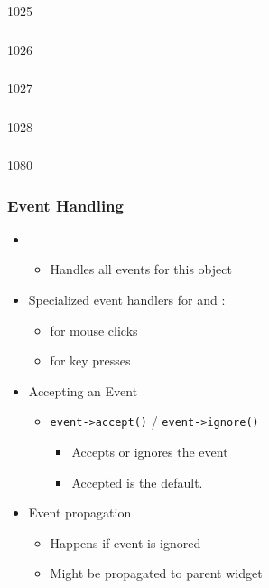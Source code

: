 \begin{slide}{1025}\frametitle{}
\end{slide}

\begin{slide}{1026}\frametitle{}
\end{slide}

\begin{slide}{1027}\frametitle{}
\end{slide}

\begin{slide}{1028}\frametitle{}

\end{slide}

\begin{slide}{1080}
\frametitle{Event Handling}

\begin{itemize}
\item {}
  \begin{itemize}
  \item Handles all events for this object
 \end{itemize}
\item Specialized event handlers for  and :
  \begin{itemize}
  \item {} for mouse clicks
  \item {} for key presses
 \end{itemize}\bigskip
\item Accepting an Event
  \begin{itemize}
  \item \lstinline{event->accept()} / \lstinline{event->ignore()}
    \begin{itemize}
    \item Accepts or ignores the event
    \item Accepted is the default.
    \end{itemize}
  \end{itemize}
\item Event propagation
  \begin{itemize}
  \item Happens if event is ignored
  \item Might be propagated to parent widget
  \end{itemize}
\end{itemize}
\end{slide}

